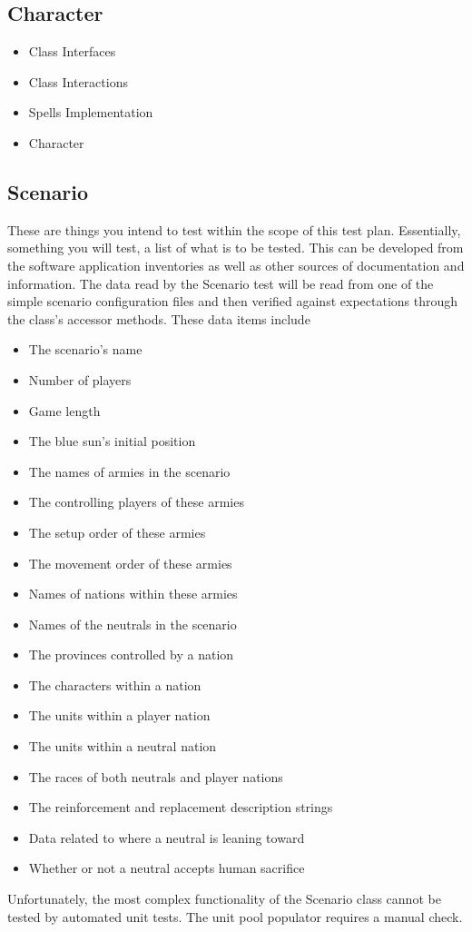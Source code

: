 {\color{black}
\subsection{Character}
\begin{itemize}
\item Class Interfaces
\item Class Interactions
\item Spells Implementation
\item Character 
\end{itemize}

\subsection{Scenario}
These are things you intend to test within the scope of this test
plan. Essentially, something you will test, a list of what is to be
tested. This can be developed from the software application
inventories as well as other sources of documentation and information.
\newline
\newline
The data read by the Scenario test will be read from one of the simple 
scenario configuration files and then verified against expectations through 
the class's accessor methods. These data items include 
\newline
\begin{itemize}
\item The scenario's name
\item Number of players
\item Game length
\item The blue sun's initial position
\item The names of armies in the scenario
\item The controlling players of these armies
\item The setup order of these armies
\item The movement order of these armies
\item Names of nations within these armies
\item Names of the neutrals in the scenario
\item The provinces controlled by a nation
\item The characters within a nation
\item The units within a player nation
\item The units within a neutral nation
\item The races of both neutrals and player nations
\item The reinforcement and replacement description strings
\item Data related to where a neutral is leaning toward
\item Whether or not a neutral accepts human sacrifice
\end{itemize}

Unfortunately, the most complex functionality of the Scenario class 
cannot be tested by automated unit tests. The unit pool populator requires 
a manual check.
}

